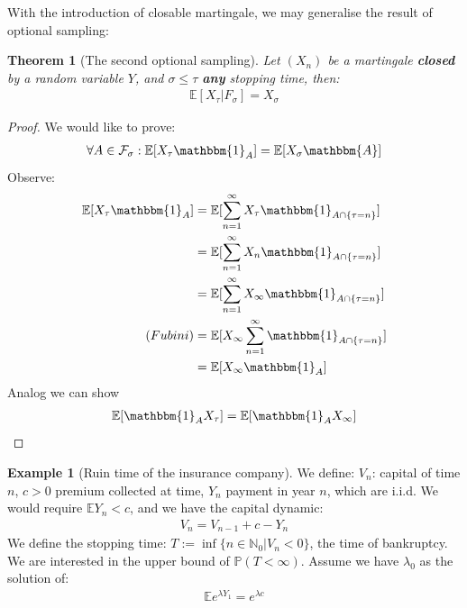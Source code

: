 \documentclass[a4paper,11pt]{book}
\newtheorem{theorem}{Theorem}[section]
\theoremstyle{definition}
\newtheorem*{example}{Example}
\theoremstyle{remark}
\begin{document}
With the introduction of closable martingale, we may generalise the result of optional sampling:

\begin{theorem}[The second optional sampling]
	Let $(X_n)$ be a martingale \textbf{closed} by a random variable $Y$, and $\sigma \leq \tau$ \textbf{any }stopping time, then:
	\begin{align*}
		\mathbb{E}[X_\tau|F_\sigma] = X_\sigma
	\end{align*}
\end{theorem}
\begin{proof}
We would like to prove:
\begin{align*}
	\forall A \in \mathcal{F}_\sigma: \mathbb{E}[X_\tau \mathbbm{1}_A] = \mathbb{E}[X_\sigma \mathbbm{A}] 
\end{align*}
Observe:
\begin{align*}
	\mathbb{E}[X_\tau\mathbbm{1}_A] &= \mathbb{E}[\sum_{n = 1}^\infty X_\tau \mathbbm{1}_{A \cap \{\tau = n\}}] \\
	&= \mathbb{E}[\sum_{n = 1}^\infty X_n \mathbbm{1}_{A \cap \{\tau = n\}}]\\
	&= \mathbb{E}[\sum_{n = 1}^\infty X_\infty \mathbbm{1}_{A \cap \{\tau = n\}}]\\
	(Fubini)
	&= \mathbb{E}[X_\infty \sum_{n = 1}^\infty \mathbbm{1}_{A \cap \{\tau = n\}}]\\
	&= \mathbb{E}[X_\infty \mathbbm{1}_A]
\end{align*}
Analog we can show
\begin{align*}
	\mathbb{E}[\mathbbm{1}_{A}X_\tau] = \mathbb{E}[\mathbbm{1}_{A}X_\infty]
\end{align*}
\end{proof}


\begin{example}[Ruin time of the insurance company]
We define: $V_n$: capital of time $n$, $c > 0$ premium collected at time, $Y_n$ payment in year $n$, which are i.i.d. We would require $\mathbb{E}Y_n < c$, and we have the capital dynamic:
\begin{align*}
	V_n = V_{n-1} + c - Y_n
\end{align*} 
We define the stopping time: $T := \inf \{ n \in \mathbb{N}_0 |V_n < 0\}$, the time of bankruptcy. We are interested in the upper bound of $\mathbb{P}(T < \infty)$. Assume we have $\lambda_0$ as the solution of:
\begin{align*}
	\mathbb{E} e^{\lambda Y_1} = e^{\lambda c}
\end{align*}
\end{example}
\end{document}

